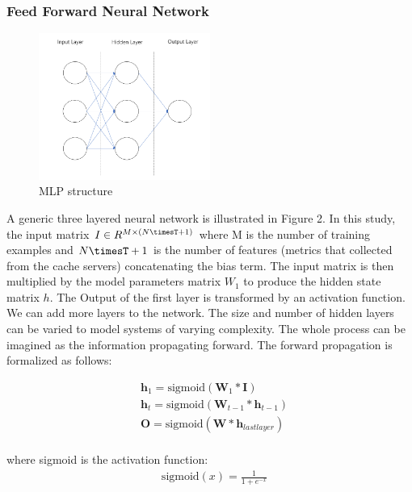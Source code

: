 \documentclass[5p]{elsarticle}
\begin{document}
\subsubsection{Feed Forward Neural Network}
\begin{figure}[h]
    \centering
    \includegraphics[width=0.5\textwidth]{mlp.png}
    \caption{MLP structure}
    \label{fig:RNN}
\end{figure}

A generic three layered neural network is illustrated in Figure 2. In this study, the input matrix $I \in R^{M\times(N\timesT+1)}$  where M is the number of training examples and $N\timesT+1$ is the number of features (metrics that collected from the cache servers) concatenating the bias term. The input matrix is then multiplied by the model parameters matrix $W_1$ to produce the hidden state matrix $h$. The Output of the first layer is transformed by an activation function. We can add more layers to the network. The size and number of hidden layers can be varied to model systems of varying complexity. The whole process can be imagined as the information propagating forward. The forward propagation is formalized as follows:

\begin{equation}
    \begin{split}
    & \mathbf h_1 = \text{sigmoid}(\mathbf W_1 * \mathbf I) \\
    & \mathbf h_t = \text{sigmoid}(\mathbf W_{t-1} * \mathbf h_{t-1}) \\
    & \mathbf O=\text{sigmoid}(\mathbf W * \mathbf h_{lastlayer}) \\
    \end{split}
\end{equation}

where sigmoid is the activation function:
\begin{equation}
    \begin{split}
    & \text{sigmoid}(x)=\frac{1}{1+e^{-x}}
    \end{split}
\end{equation}
\end{document}
